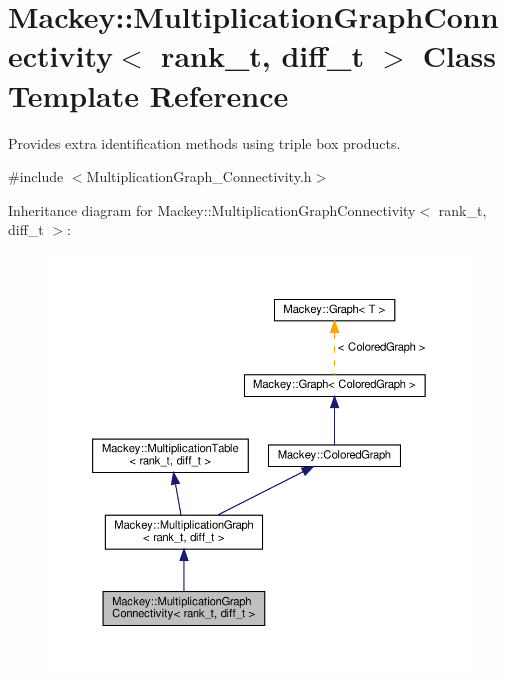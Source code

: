 \hypertarget{classMackey_1_1MultiplicationGraphConnectivity}{}\section{Mackey\+:\+:Multiplication\+Graph\+Connectivity$<$ rank\+\_\+t, diff\+\_\+t $>$ Class Template Reference}
\label{classMackey_1_1MultiplicationGraphConnectivity}


Provides extra identification methods using triple box products.  




{\ttfamily \#include $<$Multiplication\+Graph\+\_\+\+Connectivity.\+h$>$}



Inheritance diagram for Mackey\+:\+:Multiplication\+Graph\+Connectivity$<$ rank\+\_\+t, diff\+\_\+t $>$\+:\nopagebreak
\begin{figure}[H]
\begin{center}
\leavevmode
\includegraphics[width=350pt]{classMackey_1_1MultiplicationGraphConnectivity__inherit__graph}
\end{center}
\end{figure}


